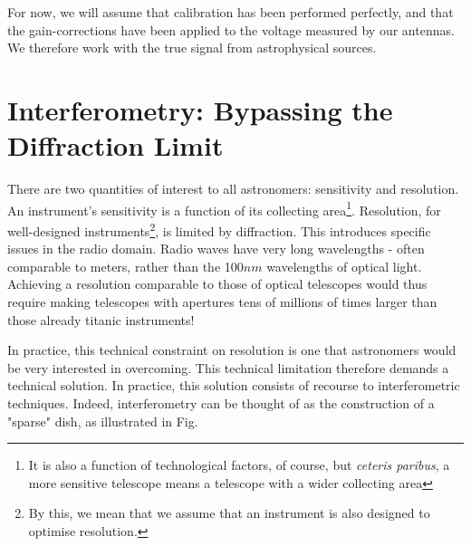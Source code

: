 \pg
For now, we will assume that calibration has been performed perfectly, and that the gain-corrections have been applied to the voltage measured by our antennas. We therefore work with the true signal from astrophysical sources.

\section{Interferometry: Bypassing the Diffraction Limit}

\pg
There are two quantities of interest to all astronomers: sensitivity and resolution. An instrument's sensitivity is a function of its collecting area\footnote{It is also a function of technological factors, of course, but \emph{ceteris paribus}, a more sensitive telescope means a telescope with a wider collecting area}. Resolution, for well-designed instruments\footnote{By this, we mean that we assume that an instrument is also designed to optimise resolution.}, is limited by diffraction. This introduces specific issues in the radio domain. Radio waves have very long wavelengths - often comparable to meters, rather than the 100$nm$ wavelengths of optical light. Achieving a resolution comparable to those of optical telescopes would thus require making telescopes with apertures tens of millions of times larger than those already titanic instruments!

\pg
In practice, this technical constraint on resolution is one that astronomers would be very interested in overcoming. This technical limitation therefore demands a technical solution. In practice, this solution consists of recourse to interferometric techniques. Indeed, interferometry can be thought of as the construction of a "sparse" dish, as illustrated in Fig.

